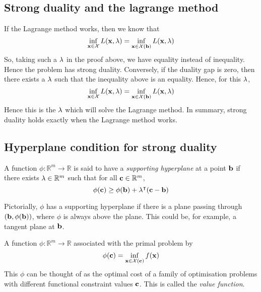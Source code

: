 \subsection{Strong duality and the lagrange method}
If the Lagrange method works, then we know that
\[
	\inf_{\vb x \in \mathcal X} L(\vb x, \vb \lambda) = \inf_{\vb x \in \mathcal X(\vb b)} L(\vb x, \vb \lambda)
\]
So, taking such a \( \vb \lambda \) in the proof above, we have equality instead of inequality.
Hence the problem has strong duality.
Conversely, if the duality gap is zero, then there exists a \( \vb \lambda \) such that the inequality above is an equality.
Hence, for this \( \vb \lambda \),
\[
	\inf_{\vb x \in \mathcal X} L(\vb x, \vb \lambda) = \inf_{\vb x \in \mathcal X(\vb b)} L(\vb x, \vb \lambda)
\]
Hence this is the \( \vb \lambda \) which will solve the Lagrange method.
In summary, strong duality holds exactly when the Lagrange method works.

\subsection{Hyperplane condition for strong duality}
\begin{definition}
	A function \( \phi \colon \mathbb R^m \to \mathbb R \) is said to have a \textit{supporting hyperplane} at a point \( \vb b \) if there exists \( \vb \lambda \in \mathbb R^m \) such that for all \( \vb c \in \mathbb R^m \),
	\[
		\phi(\vb c) \geq \phi(\vb b) + \vb\lambda^\intercal (\vb c - \vb b)
	\]
\end{definition}
\noindent Pictorially, \( \phi \) has a supporting hyperplane if there is a plane passing through \( (\vb b, \phi(\vb b)) \), where \( \phi \) is always above the plane.
This could be, for example, a tangent plane at \( \vb b \).

\begin{definition}
	A function \( \phi \colon \mathbb R^m \to \mathbb R \) associated with the primal problem by
	\[
		\phi(\vb c) = \inf_{\vb x \in \mathcal X(\vb c)} f(\vb x)
	\]
	This \( \phi \) can be thought of as the optimal cost of a family of optimisation problems with different functional constraint values \( \vb c \).
	This is called the \textit{value function}.
\end{definition}

